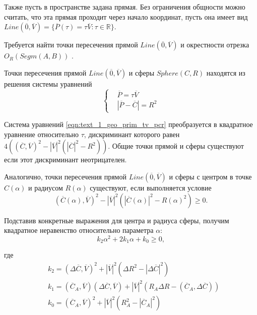 Также пусть в пространстве задана прямая.
Без ограничения общности можно считать, что эта прямая проходит через начало координат, пусть она имеет вид $Line(\overline{0}, \overline{V}) = \{ \overline{P}(\tau) = \tau \overline{V}: \tau \in \mathbb{R} \}$.

Требуется найти точки пересечения прямой $Line(\overline{0}, \overline{V})$ и окрестности отрезка $O_R(Segm(A, B))$ \cite{Rybakov2017Flight}.

Точки пересечения прямой $Line(\overline{0}, \overline{V})$ и сферы $Sphere(C, R)$ находятся из решения системы уравнений
\begin{equation}\label{eqn:text_1_geo_prim_tv_pcr}
	\left\{
		\begin{aligned}
			& \overline{P} = \tau \overline{V} \\
			& |\overline{P} - \overline{C}| = R^2
		\end{aligned}
	\right.
\end{equation}

Система уравнений \eqref{eqn:text_1_geo_prim_tv_pcr} преобразуется в квадратное уравнение относительно $\tau$, дискриминант которого равен $4\left((\overline{C}, \overline{V})^2 - |\overline{V}|^2 \left(|\overline{C}|^2 - R^2\right)\right)$.
Общие точки прямой и сферы существуют если этот дискриминант неотрицателен.

Аналогично, точки пересечения прямой $Line(\overline{0}, \overline{V})$ и сферы с центром в точке $C(\alpha)$ и радиусом $R(\alpha)$ существуют, если выполняется условие
\begin{equation}
	(\overline{C}(\alpha), \overline{V})^2 - |\overline{V}|^2 \left(|\overline{C}(\alpha)|^2 - R(\alpha)^2\right) \ge 0.
\end{equation}

Подставив конкретные выражения для центра и радиуса сферы, получим квадратное неравенство относительно параметра $\alpha$:
\begin{equation}\label{eqn:text_1_geo_prim_ineq_k2k1k0}
	k_2 \alpha^2 + 2 k_1 \alpha + k_0 \ge 0,
\end{equation}

где
\begin{equation}\label{eqn:text_1_geo_prim_k2k1k0}
	\begin{aligned}
		& k_2 = (\Delta \overline{C}, \overline{V})^2 + |\overline{V}|^2 \left( \Delta R^2 - |\Delta \overline{C}|^2 \right) \\
		& k_1 = (\overline{C}_A, \overline{V})(\Delta \overline{C}, \overline{V}) + |\overline{V}|^2 \left(R_A \Delta R - (\overline{C}_A, \Delta \overline{C}) \right) \\
		& k_0 = (\overline{C}_A, \overline{V})^2 + |\overline{V}|^2 \left( R_A^2 - |\overline{C}_A|^2 \right)
	\end{aligned}
\end{equation}

